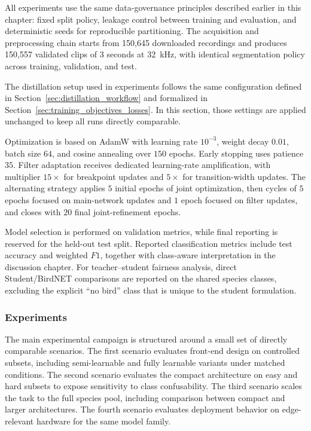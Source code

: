 \documentclass[a4paper,singleside,12pt]{report} %
\begin{document}
	All experiments use the same data-governance principles described earlier in this chapter: fixed split policy, leakage control between training and evaluation, and deterministic seeds for reproducible partitioning. The acquisition and preprocessing chain starts from 150,645 downloaded recordings and produces 150,557 validated clips of 3 seconds at 32~kHz, with identical segmentation policy across training, validation, and test.

	The distillation setup used in experiments follows the same configuration defined in Section~\ref{sec:distillation_workflow} and formalized in Section~\ref{sec:training_objectives_losses}. In this section, those settings are applied unchanged to keep all runs directly comparable.

	Optimization is based on AdamW with learning rate \(10^{-3}\), weight decay \(0.01\), batch size \(64\), and cosine annealing over \(150\) epochs. Early stopping uses patience \(35\). Filter adaptation receives dedicated learning-rate amplification, with multiplier \(15\times\) for breakpoint updates and \(5\times\) for transition-width updates. The alternating strategy applies \(5\) initial epochs of joint optimization, then cycles of \(5\) epochs focused on main-network updates and \(1\) epoch focused on filter updates, and closes with \(20\) final joint-refinement epochs.

	Model selection is performed on validation metrics, while final reporting is reserved for the held-out test split. Reported classification metrics include test accuracy and weighted \(F1\), together with class-aware interpretation in the discussion chapter. For teacher--student fairness analysis, direct Student/BirdNET comparisons are reported on the shared species classes, excluding the explicit ``no bird'' class that is unique to the student formulation.

	\subsubsection{Experiments}
	The main experimental campaign is structured around a small set of directly comparable scenarios. The first scenario evaluates front-end design on controlled subsets, including semi-learnable and fully learnable variants under matched conditions. The second scenario evaluates the compact architecture on easy and hard subsets to expose sensitivity to class confusability. The third scenario scales the task to the full species pool, including comparison between compact and larger architectures. The fourth scenario evaluates deployment behavior on edge-relevant hardware for the same model family.
\end{document}
